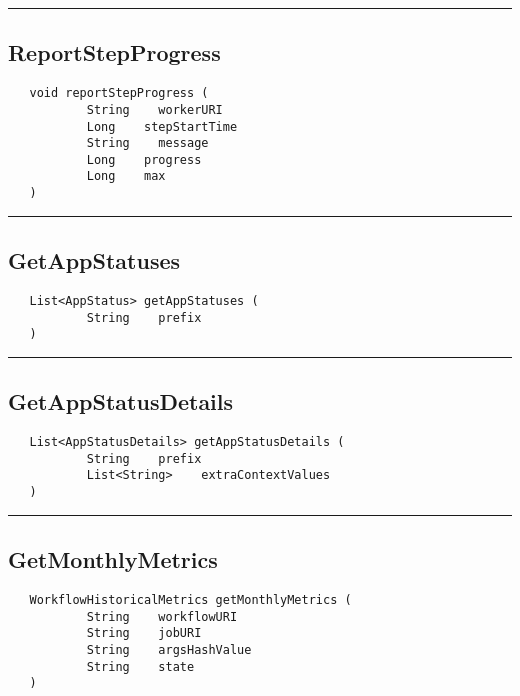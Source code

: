 \rule{15cm}{2pt}
\subsection{ReportStepProgress}
\label{Api:ReportStepProgress}
\begin{verbatim}
   void reportStepProgress (
           String    workerURI
           Long    stepStartTime
           String    message
           Long    progress
           Long    max
   )
\end{verbatim}



\rule{15cm}{2pt}
\subsection{GetAppStatuses}
\label{Api:GetAppStatuses}
\begin{verbatim}
   List<AppStatus> getAppStatuses (
           String    prefix
   )
\end{verbatim}



\rule{15cm}{2pt}
\subsection{GetAppStatusDetails}
\label{Api:GetAppStatusDetails}
\begin{verbatim}
   List<AppStatusDetails> getAppStatusDetails (
           String    prefix
           List<String>    extraContextValues
   )
\end{verbatim}



\rule{15cm}{2pt}
\subsection{GetMonthlyMetrics}
\label{Api:GetMonthlyMetrics}
\begin{verbatim}
   WorkflowHistoricalMetrics getMonthlyMetrics (
           String    workflowURI
           String    jobURI
           String    argsHashValue
           String    state
   )
\end{verbatim}



